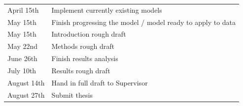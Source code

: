 \begin{center}
	\begin{table}[!h]

		\vspace{2mm}
		\begin{tabular}{ p{3cm}   p{10cm} } 
			
			April 15th & Implement currently existing models \\ 
			May 15th & Finish progressing the model / model ready to apply to data\\
			May 15th & Introduction rough draft\\
			May 22nd & Methods rough draft\\
			June 26th & Finish results analysis\\
			July 10th & Results rough draft\\
			August 14th & Hand in full draft to Supervisor\\
			August 27th & Submit thesis\\
	
		\end{tabular}
	\end{table}	
\end{center}
\renewcommand\sfdefault{phv}
\renewcommand\mddefault{mc}
\renewcommand\bfdefault{bc}
\sffamily
